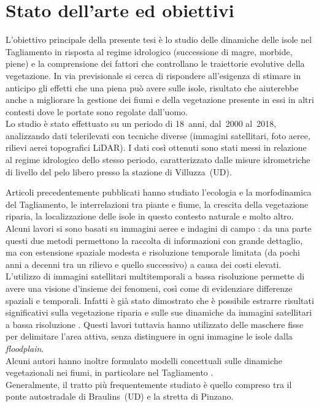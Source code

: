 \section{Stato dell'arte ed obiettivi}
\label{sec:stato-arte-obiettivi}
L'obiettivo principale della presente tesi è lo studio delle dinamiche delle isole nel Tagliamento in risposta al regime idrologico (successione di magre, morbide, piene) e la comprensione dei fattori che controllano le traiettorie evolutive della vegetazione.
In via previsionale si cerca di rispondere all'esigenza di stimare in anticipo gli effetti che una piena può avere sulle isole, risultato che aiuterebbe anche a migliorare la gestione dei fiumi e della vegetazione presente in essi in altri contesti dove le portate sono regolate dall'uomo. 
\\
Lo studio è stato effettuato su un periodo di 18~anni, dal~2000 al~2018, analizzando dati telerilevati con tecniche diverse (immagini satellitari, foto aeree, rilievi aerei topografici LiDAR).
I dati così ottenuti sono stati messi in relazione al regime idrologico dello stesso periodo, caratterizzato dalle misure idrometriche di livello del pelo libero presso la stazione di Villuzza~(UD). 

Articoli precedentemente pubblicati hanno studiato l'ecologia e la morfodinamica del Tagliamento, le interrelazioni tra piante e fiume, la crescita della vegetazione riparia, la localizzazione delle isole in questo contesto naturale e molto altro.
\\
Alcuni lavori si sono basati su immagini aeree e indagini di campo : da una parte questi due metodi permettono la raccolta di informazioni con grande dettaglio, ma con estensione spaziale modesta e risoluzione temporale limitata (da pochi anni a decenni tra un rilievo e quello successivo) a causa dei costi elevati.
\\
L'utilizzo di immagini satellitari multitemporali a bassa risoluzione permette di avere una visione d'insieme dei fenomeni, così come di evidenziare differenze spaziali e temporali.
Infatti è già stato dimostrato che è possibile estrarre risultati significativi sulla vegetazione riparia e sulle sue dinamiche da immagini satellitari a bassa risoluzione .
Questi lavori tuttavia hanno utilizzato delle maschere fisse per delimitare l'area attiva, senza distinguere in ogni immagine le isole dalla \emph{floodplain}.
\\
Alcuni autori hanno inoltre formulato modelli concettuali sulle dinamiche vegetazionali nei fiumi, in particolare nel Tagliamento .
\\
Generalmente, il tratto più frequentemente studiato è quello compreso tra il ponte autostradale di Braulins~(UD) e la stretta di Pinzano.

